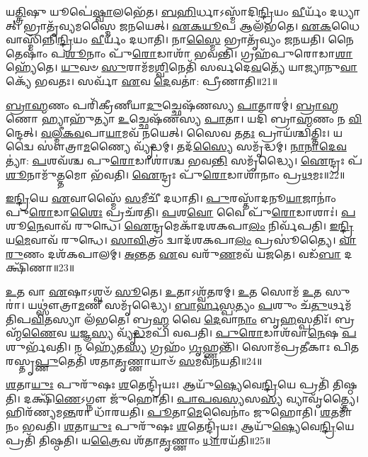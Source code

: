 𑌯\-\ul{𑌤𑍍𑌤𑍍𑌰𑌿}\-𑌷𑍁 𑌯𑍂𑌪𑍇॑\-\ul{𑌷𑍍𑌵𑌾}\-𑌲𑌭𑍇᳴𑌤।
\-\ul{𑌬}\-\-\ul{𑌹𑌿}\-𑌰𑍍𑌧𑌾\-𑌽𑌸𑍍𑌮𑌾᳴𑌦𑌿\-\ul{𑌨𑍍𑌦𑍍𑌰𑌿}\-𑌯𑌂 \ul{𑌵𑍀}\-𑌰𑍍𑌯𑌂᳴ 𑌦𑌧𑍍𑌯𑌾𑌤𑍍।
𑌭𑍍𑌰𑌾𑌤𑍃᳴𑌵𑍍𑌯𑌮𑌸𑍍𑌮𑍈 𑌜𑌨𑌯𑍇𑌤𑍍।
\-\ul{𑌏}\-\-\ul{𑌕}\-\-\ul{𑌯𑍂}\-𑌪 𑌆𑌲᳴𑌭𑌤𑍇।
\-\ul{𑌏}\-\-\ul{𑌕}\-𑌧𑍈𑌵𑌾𑌸𑍍𑌮𑌿᳴𑌨𑍍𑌨𑌿\-\ul{𑌨𑍍𑌦𑍍𑌰𑌿}\-𑌯𑌂 \ul{𑌵𑍀}\-𑌰𑍍𑌯𑌂᳴ 𑌦𑌧𑌾𑌤𑌿।
𑌨𑌾\-\ul{𑌸𑍍𑌮𑍈} 𑌭𑍍𑌰𑌾𑌤𑍃᳴𑌵𑍍𑌯𑌂 𑌜𑌨𑌯𑌤𑌿।
𑌨𑍈𑌤𑍇𑌷𑌾𑌂॑ 𑌪\-\ul{𑌶𑍂}\-𑌨𑌾𑌂 𑌪𑍁᳴\-\ul{𑌰𑍋}\-𑌡𑌾𑌶𑌾᳴ 𑌭𑌵𑌨𑍍𑌤𑌿।
𑌗𑍍𑌰𑌹᳴𑌪𑍁𑌰𑍋𑌡𑌾\-\ul{𑌶𑌾} 𑌹𑍍𑌯𑍇᳴𑌤𑍇।
\-\ul{𑌯𑍁}\-𑌵𑍞 \ul{𑌸𑍁}\-𑌰𑌾𑌮᳴𑌮\-\ul{𑌶𑍍𑌵𑌿}\-𑌨𑍇𑌤𑌿᳴ 𑌸𑌰𑍍𑌵𑌦𑍇\-\ul{𑌵}\-𑌤𑍍𑌯𑍇᳴ 𑌯𑌾𑌜𑍍𑌯𑌾𑌨𑍁\-\ul{𑌵𑌾}\-𑌕𑍍𑌯𑍇᳴ 𑌭𑌵𑌤𑌃।
𑌸𑌰𑍍𑌵𑌾᳴ \ul{𑌏}\-𑌵 \ul{𑌦𑍇}\-𑌵𑌤𑌾॑: 𑌪𑍍𑌰𑍀𑌣𑌾𑌤𑌿॥21॥

\-\ul{𑌬𑍍𑌰𑌾}\-\-\ul{𑌹𑍍𑌮}\-𑌣𑌂 𑌪𑌰𑌿᳴𑌕𑍍𑌰𑍀𑌣𑍀𑌯𑌾\-\ul{𑌦𑍁}\-𑌚𑍍𑌛𑍇𑌷᳴𑌣𑌸𑍍𑌯 \ul{𑌪𑌾}\-𑌤𑌾𑌰𑌮𑍍॑।
\-\ul{𑌬𑍍𑌰𑌾}\-\-\ul{𑌹𑍍𑌮}\-𑌣𑍋 𑌹𑍍𑌯𑌾𑌹𑍁᳴𑌤𑍍𑌯𑌾 \ul{𑌉}\-𑌚𑍍𑌛𑍇𑌷᳴𑌣𑌸𑍍𑌯 \ul{𑌪𑌾}\-𑌤𑌾।
𑌯𑌦𑌿᳴ 𑌬𑍍𑌰𑌾\-\ul{𑌹𑍍𑌮}\-𑌣𑌂 𑌨 \ul{𑌵𑌿}\-𑌨𑍍𑌦𑍇𑌤𑍍।
\-\ul{𑌵}\-\-\ul{𑌲𑍍𑌮𑍀}\-\-\ul{𑌕}\-\-\ul{𑌵}\-𑌪𑌾\-\ul{𑌯𑌾}\-𑌮𑌵᳴ 𑌨𑌯𑍇𑌤𑍍।
𑌸𑍈𑌵 𑌤\-\ul{𑌤𑌃} 𑌪𑍍𑌰𑌾𑌯᳴𑌶𑍍𑌚𑌿𑌤𑍍𑌤𑌿𑌃।
𑌯𑌦𑍍𑌵𑍈 𑌸𑍗॑𑌤𑍍𑌰𑌾\-\ul{𑌮}\-𑌣𑍍𑌯𑍈 𑌵𑍍𑌯𑍃᳴𑌦𑍍𑌧𑌮𑍍।
𑌤𑌦᳴\-\ul{𑌸𑍍𑌯𑍈} 𑌸𑌮𑍃᳴𑌦𑍍𑌧𑌮𑍍।
\-\ul{𑌨𑌾}\-\-\ul{𑌨𑌾}\-\-\ul{𑌦𑍇}\-\-\ul{𑌵}\-𑌤𑍍𑌯𑌾॑: \ul{𑌪}\-𑌶𑌵᳴𑌶𑍍𑌚 𑌪𑍁\-\ul{𑌰𑍋}\-𑌡𑌾𑌶𑌾॑𑌶𑍍𑌚 𑌭𑌵\-\ul{𑌨𑍍𑌤𑌿} 𑌸𑌮𑍃᳴𑌦𑍍𑌧𑍍𑌯𑍈।
\-\ul{𑌐}\-𑌨𑍍𑌦𑍍𑌰𑌃 𑌪᳴\-\ul{𑌶𑍂}\-𑌨𑌾𑌮𑍁᳴\-\ul{𑌤𑍍𑌤}\-𑌮𑍋 𑌭᳴𑌵𑌤𑌿।
\-\ul{𑌐}\-𑌨𑍍𑌦𑍍𑌰𑌃 𑌪𑍁᳴\-\ul{𑌰𑍋}\-𑌡𑌾𑌶𑌾᳴𑌨𑌾𑌂 𑌪𑍍𑌰\-\ul{𑌥}\-𑌮𑌃॥22॥

\-\ul{𑌇}\-\-\ul{𑌨𑍍𑌦𑍍𑌰𑌿}\-𑌯𑍇 \ul{𑌏}\-𑌵𑌾𑌸𑍍𑌮𑍈᳴ \ul{𑌸}\-𑌮𑍀𑌚𑍀᳴ 𑌦𑌧𑌾𑌤𑌿।
\-\ul{𑌪𑍁}\-𑌰𑌸𑍍𑌤𑌾᳴𑌦𑌨𑍂\-\ul{𑌯𑌾}\-𑌜𑌾𑌨𑌾𑌂॑ 𑌪𑍁\-\ul{𑌰𑍋}\-𑌡𑌾\-\ul{𑌶𑍈𑌃} 𑌪𑍍𑌰𑌚᳴𑌰𑌤𑌿।
\-\ul{𑌪}\-𑌶\-\ul{𑌵𑍋} 𑌵𑍈 𑌪𑍁᳴\-\ul{𑌰𑍋}\-𑌡𑌾𑌶𑌾𑌃॑।
\-\ul{𑌪}\-𑌶𑍂\-\ul{𑌨𑍇}\-𑌵𑌾𑌵᳴ 𑌰𑍁𑌨𑍍𑌧𑍇।
\-\ul{𑌐}\-𑌨𑍍𑌦𑍍𑌰𑌮𑍇𑌕𑌾᳴\-𑌦𑌶\-𑌕𑌪𑌾\-\ul{𑌲𑌂} 𑌨𑌿𑌰𑍍𑌵᳴𑌪𑌤𑌿।
\-\ul{𑌇}\-\-\ul{𑌨𑍍𑌦𑍍𑌰𑌿}\-𑌯\-\ul{𑌮𑍇}\-𑌵𑌾𑌵᳴ 𑌰𑍁𑌨𑍍𑌧𑍇।
\-\ul{𑌸𑌾}\-\-\ul{𑌵𑌿}\-𑌤𑍍𑌰𑌂 𑌦𑍍𑌵𑌾𑌦᳴𑌶𑌕𑌪𑌾\-\ul{𑌲𑌂} 𑌪𑍍𑌰𑌸𑍂॑𑌤𑍍𑌯𑍈।
\-\ul{𑌵𑌾}\-\-\ul{𑌰𑍁}\-𑌣𑌂 𑌦𑌶᳴𑌕𑌪𑌾𑌲𑌮𑍍।
\-\ul{𑌅}\-\-\ul{𑌨𑍍𑌤}\-𑌤 \ul{𑌏}\-𑌵 𑌵𑌰𑍁᳴\-\ul{𑌣}\-𑌮𑌵᳴ 𑌯𑌜𑌤𑍇।
𑌵𑌡᳴\-\ul{𑌬𑌾} 𑌦𑌕𑍍𑌷𑌿᳴𑌣𑌾॥23॥

\-\ul{𑌉}\-𑌤 𑌵𑌾 \ul{𑌏}\-𑌷𑌾\-𑌽𑌶𑍍𑌵𑍞᳴ \ul{𑌸𑍂}\-𑌤𑍇।
\-\ul{𑌉}\-𑌤𑌾𑌽𑌶𑍍𑌵᳴\-\ul{𑌤}\-𑌰𑌮𑍍।
\-\ul{𑌉}\-𑌤 𑌸𑍋𑌮᳴ \ul{𑌉}\-𑌤 𑌸𑍁𑌰𑌾॑।
𑌯𑌥𑍍𑌸𑍗॑𑌤𑍍𑌰𑌾\-\ul{𑌮}\-𑌣𑍀 𑌸𑌮𑍃᳴𑌦𑍍𑌧𑍍𑌯𑍈।
\-\ul{𑌬𑌾}\-\-\ul{𑌰𑍍}\-\-\ul{𑌹}\-\-\ul{𑌸𑍍𑌪}\-𑌤𑍍𑌯𑌂 \ul{𑌪}\-𑌶𑍁𑌂 𑌚᳴\-\ul{𑌤𑍁}\-𑌰𑍍𑌥𑌮᳴𑌤𑌿𑌪\-\ul{𑌵𑌿}\-𑌤𑌸𑍍𑌯𑌾 𑌲᳴𑌭𑌤𑍇।
𑌬𑍍𑌰\-\ul{𑌹𑍍𑌮} 𑌵𑍈 \ul{𑌦𑍇}\-𑌵𑌾\-\ul{𑌨𑌾𑌂} 𑌬𑍃\-\ul{𑌹}\-𑌸𑍍𑌪𑌤𑌿𑌃᳴।
𑌬𑍍𑌰𑌹𑍍𑌮᳴\-\ul{𑌣𑍈}\-𑌵 \ul{𑌯}\-𑌜𑍍𑌞\-\ul{𑌸𑍍𑌯} 𑌵𑍍𑌯𑍃᳴\-\ul{𑌦𑍍𑌧}\-𑌮𑌪𑌿᳴ 𑌵𑌪𑌤𑌿।
\-\ul{𑌪𑍁}\-\-\ul{𑌰𑍋}\-𑌡𑌾𑌶᳴𑌵𑌾\-\ul{𑌨𑍇}\-𑌷 \ul{𑌪}\-𑌶𑍁𑌰𑍍𑌭᳴𑌵𑌤𑌿।
𑌨 𑌹𑍍𑌯𑍇᳴𑌤\-\ul{𑌸𑍍𑌯} 𑌗𑍍𑌰𑌹𑌂᳴ \ul{𑌗𑍃}\-𑌹𑍍𑌣𑌨𑍍𑌤𑌿᳴।
𑌸𑍋𑌮᳴𑌪𑍍𑌰𑌤𑍀𑌕𑌾𑌃 𑌪𑌿𑌤𑌰𑌸𑍍𑌤𑍃\-\ul{𑌪𑍍𑌣𑍁}\-𑌤𑍇𑌤𑌿᳴ 𑌶𑌤𑌾\-\ul{𑌤𑍃}\-𑌣𑍍𑌣𑌾𑌯𑌾𑍞᳴ \ul{𑌸}\-𑌮𑌵᳴𑌨𑌯𑌤𑌿॥24॥

\-\ul{𑌶}\-𑌤𑌾\-\ul{𑌯𑍁𑌃} 𑌪𑍁𑌰𑍁᳴𑌷𑌃 \ul{𑌶}\-𑌤𑍇𑌨𑍍𑌦𑍍𑌰𑌿᳴𑌯𑌃।
𑌆𑌯𑍁᳴\-\ul{𑌷𑍍𑌯𑍇}\-𑌵𑍇\-\ul{𑌨𑍍𑌦𑍍𑌰𑌿}\-𑌯𑍇 𑌪𑍍𑌰𑌤𑌿᳴ 𑌤𑌿𑌷𑍍𑌠𑌤𑌿।
𑌦𑌕𑍍𑌷𑌿᳴\-\ul{𑌣𑍇}\-\-𑌽𑌗𑍍𑌨𑍗 𑌜𑍁᳴𑌹𑍋𑌤𑌿।
\-\ul{𑌪𑌾}\-\-\ul{𑌪}\-\-\ul{𑌵}\-\-\ul{𑌸𑍍𑌯}\-𑌸\-\ul{𑌸𑍍𑌯} 𑌵𑍍𑌯𑌾𑌵𑍃᳴𑌤𑍍𑌤𑍍𑌯𑍈।
𑌹𑌿𑌰᳴𑌣𑍍𑌯𑌮\-\ul{𑌨𑍍𑌤}\-𑌰𑌾 𑌧𑌾᳴𑌰𑌯𑌤𑌿।
\-\ul{𑌪𑍂}\-𑌤𑌾\-\ul{𑌮𑍇}\-𑌵𑍈𑌨𑌾𑌂॑ 𑌜𑍁𑌹𑍋𑌤𑌿।
\-\ul{𑌶}\-𑌤𑌮𑌾᳴𑌨𑌂 𑌭𑌵𑌤𑌿।
\-\ul{𑌶}\-𑌤𑌾\-\ul{𑌯𑍁𑌃} 𑌪𑍁𑌰𑍁᳴𑌷𑌃 \ul{𑌶}\-𑌤𑍇𑌨𑍍𑌦𑍍𑌰𑌿᳴𑌯𑌃।
𑌆𑌯𑍁᳴\-\ul{𑌷𑍍𑌯𑍇}\-𑌵𑍇\-\ul{𑌨𑍍𑌦𑍍𑌰𑌿}\-𑌯𑍇 𑌪𑍍𑌰𑌤𑌿᳴ 𑌤𑌿𑌷𑍍𑌠𑌤𑌿।
𑌯\-\ul{𑌤𑍍𑌰𑍈}\-𑌵 𑌶᳴𑌤𑌾\-\ul{𑌤𑍃}\-𑌣𑍍𑌣𑌾𑌂 \ul{𑌧𑌾}\-𑌰𑌯᳴𑌤𑌿॥25॥

